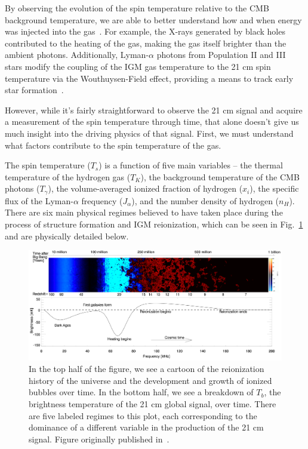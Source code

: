 By observing the evolution of the spin temperature relative to the CMB 
background temperature, we are able to better understand how and when energy 
was injected into the gas~\citep{pritchard-loeb2010}. For example, the X-rays 
generated by black holes contributed to the heating of the gas, making the gas 
itself brighter than the ambient photons. Additionally, Lyman-$\alpha$ photons 
from Population II and III stars modify the coupling of the IGM gas temperature 
to the 21 cm spin temperature via the Wouthuysen-Field effect, providing a 
means to track early star formation~\citep{furlanetto2006}.

However, while it's fairly straightforward to observe the 21 cm signal and 
acquire a measurement of the spin temperature through time, that alone doesn't 
give us much insight into the driving physics of that signal. First, we must 
understand what factors contribute to the spin temperature of the gas.

The spin temperature ($T_s$) is a function of five main variables -- the 
thermal temperature of the hydrogen gas ($T_K$), the background temperature of 
the CMB photons ($T_\gamma$), the volume-averaged ionized fraction of hydrogen 
($x_i$), the specific flux of the Lyman-$\alpha$ frequency ($J_\alpha$), and 
the number density of hydrogen ($n_H$). There are six main physical regimes 
believed to have taken place during the process of structure formation and IGM 
reionization, which can be seen in Fig.~\ref{fig:global-signal} and are 
physically detailed below.

\begin{figure}
    \begin{center}
    \includegraphics[width=\linewidth]{global_signal.png}
    \end{center}
    \caption{
        In the top half of the figure, we see a cartoon of the reionization 
        history of the universe and the development and growth of ionized 
        bubbles over time. In the bottom half, we see a breakdown of $T_b$, the 
        brightness temperature of the 21 cm global signal, over time. There are 
        five labeled regimes to this plot, each corresponding to the dominance 
        of a different variable in the production of the 21 cm signal. Figure 
        originally published in~\citealp{pritchard-loeb2012}.
    }
    \label{fig:global-signal}
\end{figure}

